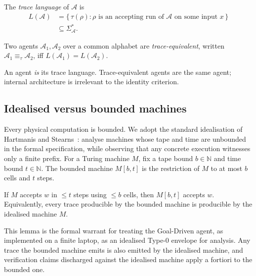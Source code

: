 \begin{definition}
\label{def:tracelang}
The \emph{trace language} of $\mathcal{A}$ is
\[
\begin{aligned}
L(\mathcal{A}) &=
\{\,\tau(\rho) : \rho \text{ is an accepting run of }
\mathcal{A} \text{ on some input } x\,\}\\
&\subseteq \Sigma_\mathcal{A}^*.
\end{aligned}
\]
\end{definition}

\begin{definition}
\label{def:traceeq}
Two agents $\mathcal{A}_1, \mathcal{A}_2$ over a common alphabet
are \emph{trace-equivalent}, written
$\mathcal{A}_1 \equiv_\tau \mathcal{A}_2$, iff
$L(\mathcal{A}_1) = L(\mathcal{A}_2)$.
\end{definition}

\noindent An agent \emph{is} its trace language.  Trace-equivalent
agents are the same agent; internal architecture is irrelevant to
the identity criterion.

\subsection{Idealised versus bounded machines}

Every physical computation is bounded.  We adopt the standard
idealisation of Hartmanis and Stearns~\cite{hartmanis1965computational}:
analyse machines whose tape and time are unbounded in the formal
specification, while observing that any concrete execution witnesses
only a finite prefix.  For a Turing machine $M$, fix a tape bound
$b\in\mathbb{N}$ and time bound $t\in\mathbb{N}$.  The bounded
machine $M[b,t]$ is the restriction of $M$ to at most $b$ cells and
$t$ steps.

\begin{lemma}
\label{lem:bounded-soundness}
If $M$ accepts $w$ in $\le t$ steps using $\le b$ cells, then
$M[b,t]$ accepts $w$.  Equivalently, every trace producible by the
bounded machine is producible by the idealised machine $M$.
\end{lemma}

This lemma is the formal warrant for treating the Goal-Driven agent,
as implemented on a finite laptop, as an idealised Type-0 envelope
for analysis.  Any trace the bounded machine emits is also emitted
by the idealised machine, and verification claims discharged against
the idealised machine apply a fortiori to the bounded one.

